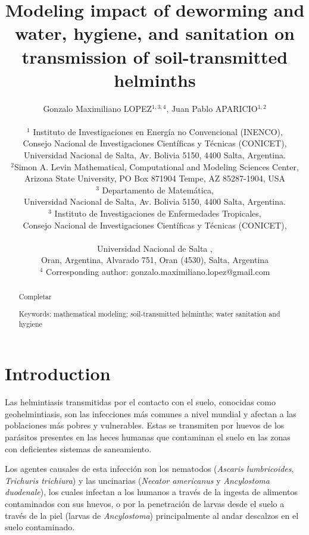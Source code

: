 \documentclass[12pt,a4paper]{article}
\title{Modeling impact of deworming and water, hygiene, and sanitation on transmission of soil-transmitted helminths}
\author{Gonzalo Maximiliano LOPEZ$^{1,3,4}$, Juan Pablo APARICIO$^{1,2}$\\
	\\
	{\small $^1$ Instituto de Investigaciones en Energ\'ia no Convencional (INENCO),} \\ {\small Consejo Nacional de Investigaciones Cient\'ificas y T\'ecnicas (CONICET),}\\
	{\small Universidad Nacional de Salta, Av. Bolivia 5150, 4400 Salta, Argentina.}\\
	$^2${\small Simon A. Levin Mathematical, Computational and Modeling Sciences Center,} \\ {\small Arizona State University, PO Box 871904 Tempe, AZ 85287-1904, USA}\\
	{\small $^3$ Departamento de Matem\'atica,}\\{\small Universidad Nacional de Salta, Av. Bolivia 5150, 4400 Salta, Argentina.}\\
	{\small $^3$ Instituto de Investigaciones de Enfermedades Tropicales,}
	\\ {\small Consejo Nacional de Investigaciones Cient\'ificas y T\'ecnicas (CONICET),}\\ 
	\\ {\small Universidad Nacional de Salta ,} 
	\\ {\small Oran, Argentina, Alvarado 751, Oran (4530), Salta, Argentina}
	\\
	{\small $^4$ Corresponding author: gonzalo.maximiliano.lopez@gmail.com}}
\date{}
\theoremstyle{plain}%
\theoremstyle{definition}
\theoremstyle{remark}
\begin{document}
\maketitle

\begin{abstract}
	Completar
	
	Keywords: mathematical modeling; soil-transmitted helminths; water sanitation and hygiene
\end{abstract}

\tableofcontents



\section{Introduction}
%	
%	
%
	Las helmintiasis transmitidas por el contacto con el suelo, conocidas como geohelmintiasis, son las infecciones más comunes a nivel mundial y afectan a las poblaciones más pobres y vulnerables. 
	Estas se transmiten por huevos de los parásitos presentes en las heces humanas que contaminan el suelo en las zonas con deficientes sistemas de saneamiento.
	
	Los agentes causales de esta infección son los nematodos (\textit{Ascaris lumbricoides}, \textit{Trichuris trichiura}) y las uncinarias (\textit{Necator americanus} y \textit{Ancylostoma duodenale}), los cuales infectan a los humanos a través de la ingesta de alimentos contaminados con sus huevos, o por la penetración de larvas desde el suelo a través de la piel (larvas de \textit{Ancylostoma}) principalmente al andar descalzos en el suelo contaminado.
	
	
\end{document}
